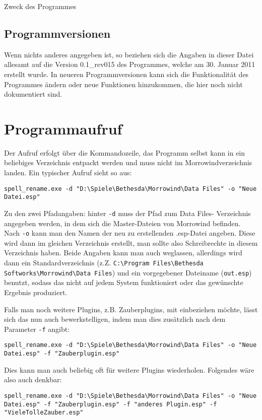 \documentclass[12pt,oneside,a4paper]{article}
\begin{document}
\begin{section}{Zweck des Programmes}
\subsection{Programmversionen}
Wenn nichts anderes angegeben ist, so beziehen sich die Angaben in dieser Datei
allesamt auf die Version 0.1\_rev015 des Programmes, welche am 30. Januar 2011
erstellt wurde. In neueren Programmversionen kann sich die Funktionalit\"{a}t des
Programmes \"{a}ndern oder neue Funktionen hinzukommen, die hier noch nicht
dokumentiert sind.
\end{section}

\section{Programmaufruf}
Der Aufruf erfolgt \"{u}ber die Kommandozeile, das Programm selbst kann in ein
beliebiges Verzeichnis entpackt werden und muss nicht im Morrowindverzeichnis
landen. Ein typischer Aufruf sieht so aus:

\texttt{spell\_rename.exe -d "D:\textbackslash{}Spiele\textbackslash{}Bethesda\textbackslash{}Morrowind\textbackslash{}Data Files" -o "Neue Datei.esp"}

Zu den zwei Pfadangaben: hinter \texttt{-d} muss der Pfad zum Data Files-
Verzeichnis angegeben werden, in dem sich die Master-Dateien von Morrowind befinden.
Nach \texttt{-o} kann man den Namen der neu zu erstellenden .esp-Datei angeben.
Diese wird dann im gleichen Verzeichnis erstellt, man sollte also Schreibrechte
in diesem Verzeichnis haben. Beide Angaben kann man auch weglassen, allerdings
wird dann ein Standardverzeichnis (z.Z. \texttt{C:\textbackslash{}Program Files\textbackslash{}Bethesda Softworks\textbackslash{}Morrowind\textbackslash{}Data Files})
und ein vorgegebener Dateiname (\texttt{out.esp}) benutzt, sodass das nicht auf
jedem System funktioniert oder das gew\"{u}nschte Ergebnis produziert.

Falls man noch weitere Plugins, z.B. Zauberplugins, mit einbeziehen m\"{o}chte,
l\"{a}sst sich das nun auch bewerkstelligen, indem man dies zus\"{a}tzlich nach
dem Parameter \texttt{-f} angibt:

\texttt{spell\_rename.exe -d "D:\textbackslash{}Spiele\textbackslash{}Bethesda\textbackslash{}Morrowind\textbackslash{}Data Files" -o "Neue Datei.esp" -f "Zauberplugin.esp"}

Dies kann man auch beliebig oft f\"{u}r weitere Plugins wiederholen.
Folgendes w\"{a}re also auch denkbar:

\texttt{spell\_rename.exe -d "D:\textbackslash{}Spiele\textbackslash{}Bethesda\textbackslash{}Morrowind\textbackslash{}Data Files" -o "Neue Datei.esp" -f "Zauberplugin.esp" -f "anderes Plugin.esp" -f "VieleTolleZauber.esp"}
\end{document}
